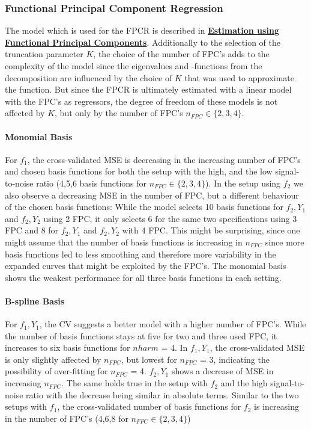 \documentclass[11pt,twoside,a4paper]{article}
\begin{document}
	\subsubsection{Functional Principal Component Regression}
	The model which is used for the FPCR is described in \hyperref[fpc_exp_transf]{\textbf{Estimation using Functional Principal Components}}. Additionally to the selection of the truncation parameter $K$, the choice of the number of FPC's adds to the complexity of the model since the eigenvalues and -functions from the decomposition are influenced by the choice of $K$ that was used to approximate the function. But since the FPCR is ultimately estimated with a linear model with the FPC's as regressors, the degree of freedom of these models is not affected by $K$, but only by the number of FPC's $n_{FPC} \in \{2, 3, 4 \}$. 
	
	\paragraph{Monomial Basis}
	For $f_1$, the cross-validated MSE is decreasing in the increasing number of FPC's and chosen basis functions for both the setup with the high, and the low signal-to-noise ratio (4,5,6 basis functions for $n_{FPC} \in \{2, 3, 4 \}$). In the setup using $f_2$ we also observe a decreasing MSE in the number of FPC, but a different behaviour of the chosen basis functions: While the model selects 10 basis functions for $f_2,Y_1$ and $f_2,Y_2$ using 2 FPC, it only selects 6 for the same two specifications using 3 FPC and 8 for $f_2,Y_1$ and $f_2,Y_2$ with 4 FPC. This might be surprising, since one might assume that the number of basis functions is increasing in $n_{FPC}$ since more basis functions led to less smoothing and therefore more variability in the expanded curves that might be exploited by the FPC's. The monomial basis shows the weakest performance for all three basis functions in each setting.
	\paragraph{B-spline Basis}
	For $f_1,Y_1$, the CV suggests a better model with a higher number of FPC's. While the number of basis functions stays at five for two and three used FPC, it increases to six basis functions for $nharm$ = 4. In $f_1,Y_1$, the cross-validated MSE is only slightly affected by $n_{FPC}$, but lowest for $n_{FPC}$ = 3, indicating the possibility of over-fitting for $n_{FPC}$ = 4. $f_2,Y_1$ shows a decrease of MSE in increasing $n_{FPC}$. The same holds true in the setup with $f_2$ and the high signal-to-noise ratio with the decrease being similar in absolute terms. Similar to the two setups with $f_1$, the cross-validated number of basis functions for $f_2$ is increasing in the number of FPC's (4,6,8 for $n_{FPC} \in \{2, 3, 4 \}$)\\
\end{document}
